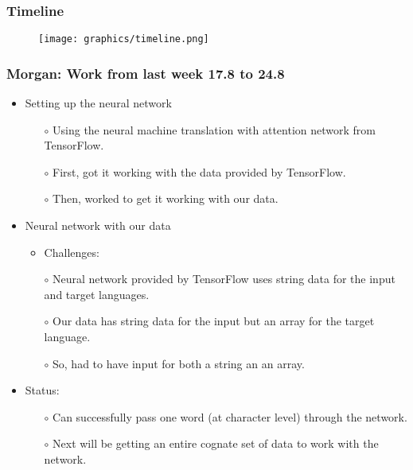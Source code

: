 \documentclass[12pt]{beamer}
\begin{document}
\begin{frame}
    \frametitle{Timeline}
    \begin{figure}[htp]
        \centering
        \texttt{[image: graphics/timeline.png]} 
    \end{figure}
\end{frame}

\begin{frame}
    \frametitle{Morgan: Work from last week 17.8 to 24.8}
    \begin{itemize}
        \item Setting up the neural network
        \begin{itemize}
            \item[$\circ$] Using the neural machine translation with attention network from TensorFlow.
            \item[$\circ$] First, got it working with the data provided by TensorFlow.
            \item[$\circ$] Then, worked to get it working with our data.
        \end{itemize}
        \item Neural network with our data
        \begin{itemize}
            \item Challenges:
        \end{itemize}
        \begin{itemize}
            \item[$\circ$] Neural network provided by TensorFlow uses string data for the input and target languages.
             \item[$\circ$] Our data has string data for the input but an array for the target language.
             \item[$\circ$] So, had to have input for both a string an an array.
        \end{itemize}
        \item Status:
        \begin{itemize}
            \item[$\circ$] Can successfully pass one word (at character level) through the network.
            \item[$\circ$] Next will be getting an entire cognate set of data to work with the network.
        \end{itemize}
    \end{itemize}
    
\end{frame}
\end{document}
